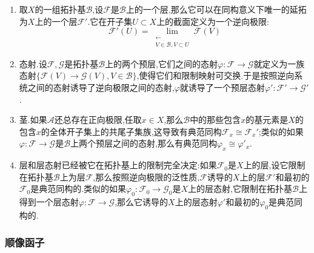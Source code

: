 \begin{enumerate}
\begin{proof}
		下面设$U\subseteq X$是任意开集,设$\{U_i,i\in I\}$是$U$的任意开覆盖,考虑$\mathscr{B}$的那些至少包含在一个$U_i$中的基元素构成的子集族$\mathscr{B}'$,这也是拓扑基,于是按照上一段,不妨设$\mathscr{B}$本身已经满足每个基元素都包含在某个$U_i$中,那么此时$\mathscr{B}$满足层公理就得到$\mathscr{F}'$满足层公理.
	\end{proof}
	\item 取$X$的一组拓扑基$\mathscr{B}$,设$\mathscr{F}$是$\mathscr{B}$上的一个层,那么它可以在同构意义下唯一的延拓为$X$上的一个层$\mathscr{F}'$.它在开子集$U\subset X$上的截面定义为一个逆向极限:
	$$\mathscr{F}'(U)=\lim\limits_{\substack{\leftarrow\\ V\in\mathscr{B},V\subset U}}\mathscr{F}(V)$$
	\item 态射.设$\mathscr{F},\mathscr{G}$是拓扑基$\mathscr{B}$上的两个预层,它们之间的态射$\varphi:\mathscr{F}\to\mathscr{G}$就定义为一族态射$\{\mathscr{F}(V)\to\mathscr{G}(V),V\in\mathscr{B}\}$,使得它们和限制映射可交换.于是按照逆向系统之间的态射诱导了逆向极限之间的态射,$\varphi$就诱导了一个预层态射$\varphi':\mathscr{F}'\to\mathscr{G}'$.
	\item 茎.如果$\mathscr{A}$还总存在正向极限,任取$x\in X$,那么$\mathscr{B}$中的那些包含$x$的基元素是$X$的包含$x$的全体开子集上的共尾子集族,这导致有典范同构$\mathscr{F}_x\cong\mathscr{F}_x'$;类似的如果$\varphi:\mathscr{F}\to\mathscr{G}$是$\mathscr{B}$上两个预层之间的态射,那么有典范同构$\varphi_x\cong\varphi'_x$.
	\item 层和层态射已经被它在拓扑基上的限制完全决定:如果$\mathscr{F}_0$是$X$上的层,设它限制在拓扑基$\mathscr{B}$上为层$\mathscr{F}$,那么按照逆向极限的泛性质,$\mathscr{F}$诱导的$X$上的层$\mathscr{F}'$和最初的$\mathscr{F}_0$是典范同构的.类似的如果$\varphi_0:\mathscr{F}_0\to\mathscr{G}_0$是$X$上的层态射,它限制在拓扑基$\mathscr{B}$上得到一个层态射$\varphi:\mathscr{F}\to\mathscr{G}$,那么它诱导的$X$上的层态射$\varphi'$和最初的$\varphi_0$是典范同构的.
\end{enumerate}
\subsubsection{顺像函子}

